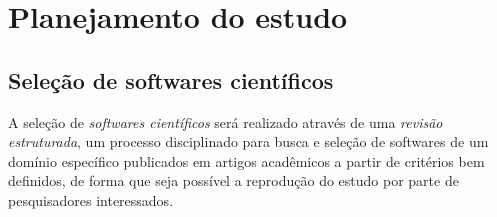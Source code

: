 
\section{Planejamento do estudo}

% 
%
%

\subsection{Seleção de softwares científicos}

A seleção de {\it softwares científicos} será realizado através de uma {\it
revisão estruturada}, um processo disciplinado para busca e seleção de
softwares de um domínio específico publicados em artigos acadêmicos a partir de
critérios bem definidos, de forma que seja possível a reprodução do estudo por
parte de pesquisadores interessados.

